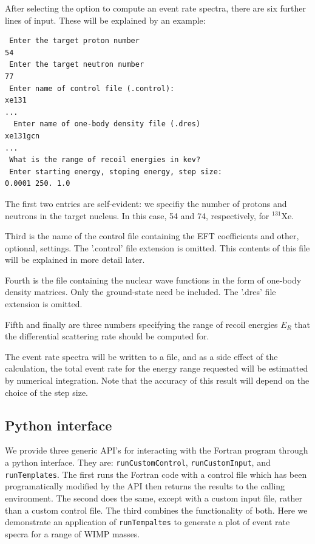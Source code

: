 \documentclass[11pt]{article}
\begin{document}
After selecting the option to compute an event rate spectra, there are six
further lines of input. These will be explained by an example:

\begin{verbatim}
 Enter the target proton number
54
 Enter the target neutron number 
77 
 Enter name of control file (.control):
xe131
...
  Enter name of one-body density file (.dres)
xe131gcn
...
 What is the range of recoil energies in kev?
 Enter starting energy, stoping energy, step size:
0.0001 250. 1.0
\end{verbatim}

The first two entries are self-evident: we specifiy the number of protons and
neutrons in the target nucleus. In this case, 54 and 74, respectively, for
$^{131}$Xe.

Third is the name of the control file containing the EFT coefficients and other,
optional, settings. The '.control' file extension is omitted. This contents of
this file will be explained in more detail later.

Fourth is the file containing the nuclear wave functions in the form of one-body
density matrices. Only the ground-state need be included. The '.dres' file
extension is omitted. 

Fifth and finally are three numbers specifying the range of recoil energies
$E_R$ that the differential scattering rate should be computed for.

The event rate spectra will be written to a file, and as a side effect of the
calculation, the total event rate for the energy range requested will be
estimatted by numerical integration. Note that the accuracy of this result will
depend on the choice of the step size.

\subsection{Python interface}

We provide three generic API's for interacting with the Fortran program through a
python interface. They are: {\tt runCustomControl}, {\tt runCustomInput}, and 
{\tt runTemplates}. 
The first runs the Fortran code with a control file
which has been programatically modified by the API then returns the results to
the calling environment. The second does the same, except with a custom input
file, rather than a custom control file. The third combines the functionality of
both. Here we demonstrate an application of {\tt runTempaltes} to generate a
plot of event rate specra for a range of WIMP masses.
\end{document}
